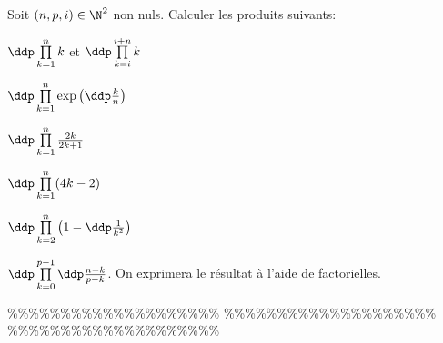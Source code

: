 



\begin{exercice}  \; 
Soit $(n,p,i)\in\N^2$ non nuls. Calculer les produits suivants:
\begin{enumerate}
\begin{minipage}[t]{0.3\textwidth}
\item $\ddp \prod\limits_{k=1}^n k$ \; et \; $\ddp \prod\limits_{k=i}^{i+n} k$
\item $\ddp \prod\limits_{k=1}^n \exp{\left(\ddp\frac{k}{n}\right)}$ 
\item $\ddp \prod\limits_{k=1}^n \frac{2k}{2k+1}$ 
\end{minipage}
\begin{minipage}[t]{0.6\textwidth}
\item $\ddp \prod\limits_{k=1}^n (4k-2)$ 
\item $\ddp \prod\limits_{k=2}^n \left(  1-\ddp\frac{1}{k^2} \right)$
\item $\ddp \prod\limits_{k=0}^{p-1} \ddp\frac{n-k}{p-k}$. On exprimera le r\'esultat \`{a} l'aide de factorielles.
\end{minipage}
\end{enumerate}
\end{exercice}


\%\%\%\%\%\%\%\%\%\%\%\%\%\%\%\%\%\%\%\%
\%\%\%\%\%\%\%\%\%\%\%\%\%\%\%\%\%\%\%\%
\%\%\%\%\%\%\%\%\%\%\%\%\%\%\%\%\%\%\%\%




